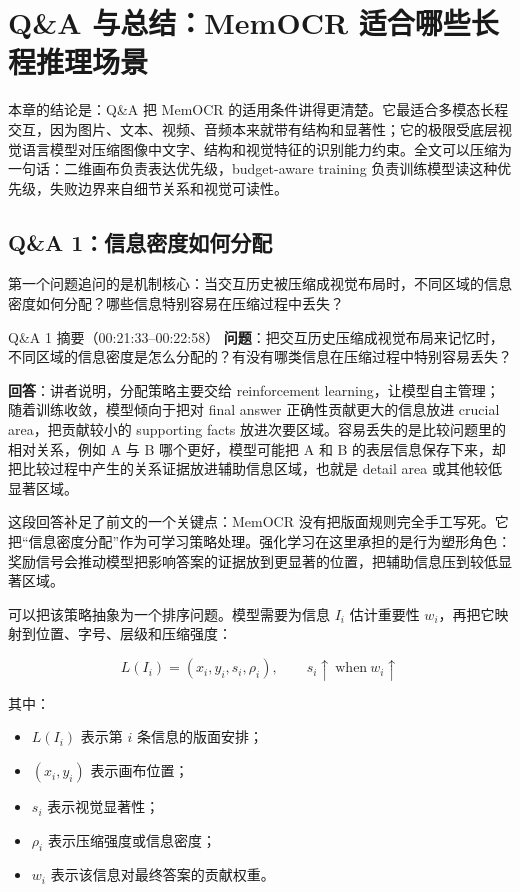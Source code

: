 \section{Q\&A 与总结：MemOCR 适合哪些长程推理场景}

本章的结论是：Q\&A 把 MemOCR 的适用条件讲得更清楚。它最适合多模态长程交互，因为图片、文本、视频、音频本来就带有结构和显著性；它的极限受底层视觉语言模型对压缩图像中文字、结构和视觉特征的识别能力约束。全文可以压缩为一句话：二维画布负责表达优先级，budget-aware training 负责训练模型读这种优先级，失败边界来自细节关系和视觉可读性。

\subsection{Q\&A 1：信息密度如何分配}

第一个问题追问的是机制核心：当交互历史被压缩成视觉布局时，不同区域的信息密度如何分配？哪些信息特别容易在压缩过程中丢失？

\begin{dialoguebox}{Q\&A 1 摘要（00:21:33--00:22:58）}
\textbf{问题}：把交互历史压缩成视觉布局来记忆时，不同区域的信息密度是怎么分配的？有没有哪类信息在压缩过程中特别容易丢失？

\textbf{回答}：讲者说明，分配策略主要交给 reinforcement learning，让模型自主管理；随着训练收敛，模型倾向于把对 final answer 正确性贡献更大的信息放进 crucial area，把贡献较小的 supporting facts 放进次要区域。容易丢失的是比较问题里的相对关系，例如 A 与 B 哪个更好，模型可能把 A 和 B 的表层信息保存下来，却把比较过程中产生的关系证据放进辅助信息区域，也就是 detail area 或其他较低显著区域。
\end{dialoguebox}

这段回答补足了前文的一个关键点：MemOCR 没有把版面规则完全手工写死。它把“信息密度分配”作为可学习策略处理。强化学习在这里承担的是行为塑形角色：奖励信号会推动模型把影响答案的证据放到更显著的位置，把辅助信息压到较低显著区域。

可以把该策略抽象为一个排序问题。模型需要为信息 $I_i$ 估计重要性 $w_i$，再把它映射到位置、字号、层级和压缩强度：

$$
L(I_i) = (x_i, y_i, s_i, \rho_i), \qquad
s_i \uparrow \ \text{when} \ w_i \uparrow
$$

其中：

\begin{itemize}
  \item $L(I_i)$ 表示第 $i$ 条信息的版面安排；
  \item $(x_i, y_i)$ 表示画布位置；
  \item $s_i$ 表示视觉显著性；
  \item $\rho_i$ 表示压缩强度或信息密度；
  \item $w_i$ 表示该信息对最终答案的贡献权重。
\end{itemize}

